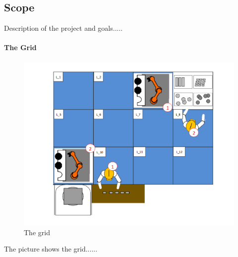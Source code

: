 \subsection{Scope}

Description of the project and goals.....


\paragraph{The Grid}

\begin{figure}[H]
	\centering
	\includegraphics[width=\linewidth]{pictures/grid.png}
	\caption{The grid}
\end{figure}

The picture shows the grid......


